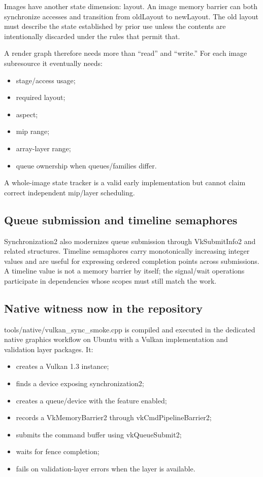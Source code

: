 Images have another state dimension: layout. An image memory barrier can both synchronize accesses and transition from oldLayout to newLayout. The old layout must describe the state established by prior use unless the contents are intentionally discarded under the rules that permit that.

A render graph therefore needs more than ``read'' and ``write.'' For each image subresource it eventually needs:

\begin{itemize}
\tightlist
\item
  stage/access usage;
\item
  required layout;
\item
  aspect;
\item
  mip range;
\item
  array-layer range;
\item
  queue ownership when queues/families differ.
\end{itemize}

A whole-image state tracker is a valid early implementation but cannot claim correct independent mip/layer scheduling.

\subsection{Queue submission and timeline semaphores}\label{appendix-f15ce0d9c170-queue-submission-and-timeline-semaphores}

Synchronization2 also modernizes queue submission through VkSubmitInfo2 and related structures. Timeline semaphores carry monotonically increasing integer values and are useful for expressing ordered completion points across submissions. A timeline value is not a memory barrier by itself; the signal/wait operations participate in dependencies whose scopes must still match the work.

\subsection{Native witness now in the repository}\label{appendix-f15ce0d9c170-native-witness-now-in-the-repository}

tools/native/vulkan\_sync\_smoke.cpp is compiled and executed in the dedicated native graphics workflow on Ubuntu with a Vulkan implementation and validation layer packages. It:

\begin{itemize}
\tightlist
\item
  creates a Vulkan 1.3 instance;
\item
  finds a device exposing synchronization2;
\item
  creates a queue/device with the feature enabled;
\item
  records a VkMemoryBarrier2 through vkCmdPipelineBarrier2;
\item
  submits the command buffer using vkQueueSubmit2;
\item
  waits for fence completion;
\item
  fails on validation-layer errors when the layer is available.
\end{itemize}

